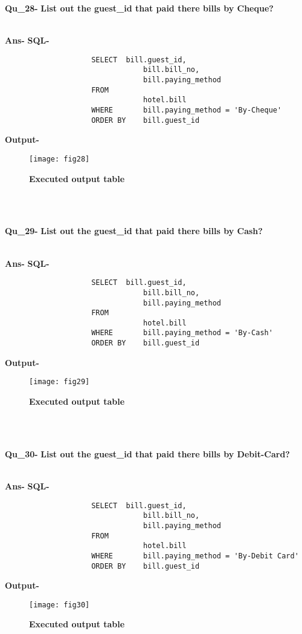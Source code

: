\documentclass[a4,12pt]{report}
\begin{document}
\textbf{Qu\_28-}  \textbf{List out the guest\_id that paid there bills by Cheque?} \\\

\textbf{Ans-}		\textbf{SQL-}
\begin{lstlisting}
					SELECT	bill.guest_id, 
								bill.bill_no, 
  		  						bill.paying_method
					FROM 
		  						hotel.bill
					WHERE		bill.paying_method = 'By-Cheque'
		  			ORDER BY	bill.guest_id
\end{lstlisting}
\textbf{Output-} \\			   
\begin{figure}[hbtp]
\centering
\texttt{[image: fig28]}
\caption{\textbf{{\color{red}Executed output table}}}
\end{figure}
\\\

\textbf{Qu\_29-}  \textbf{List out the guest\_id that paid there bills by Cash?} \\\

\textbf{Ans-}		\textbf{SQL-}
\begin{lstlisting}
					SELECT	bill.guest_id, 
								bill.bill_no, 
  		  						bill.paying_method
					FROM 
		  						hotel.bill
					WHERE		bill.paying_method = 'By-Cash'
		  			ORDER BY	bill.guest_id
\end{lstlisting}
\textbf{Output-} \\			   
\begin{figure}[hbtp]
\centering
\texttt{[image: fig29]}
\caption{\textbf{{\color{red}Executed output table}}}
\end{figure}
\\\

\textbf{Qu\_30-}  \textbf{List out the guest\_id that paid there bills by Debit-Card?} \\\

\textbf{Ans-}		\textbf{SQL-}
\begin{lstlisting}
					SELECT	bill.guest_id, 
								bill.bill_no, 
  		  						bill.paying_method
					FROM 
		  						hotel.bill
					WHERE		bill.paying_method = 'By-Debit Card'
		  			ORDER BY	bill.guest_id
\end{lstlisting}
\textbf{Output-} \\			   
\begin{figure}[hbtp]
\centering
\texttt{[image: fig30]}
\caption{\textbf{{\color{red}Executed output table}}}
\end{figure}
\\\
\end{document}
